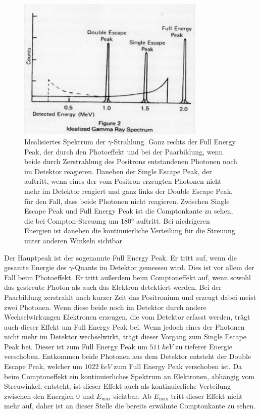 \begin{figure}
	\centering
	\includegraphics[width=0.8\textwidth]{gammaray.png}
	\caption{Idealisiertes Spektrum der $\gamma$-Strahlung. Ganz rechts der Full Energy Peak, der durch den Photoeffekt und bei der Paarbildung, wenn beide durch Zerstrahlung des Positrons entstandenen Photonen noch im Detektor reagieren. Daneben der Single Escape Peak, der auftritt, wenn eines der vom Positron erzeugten Photonen nicht mehr im Detektor reagiert und ganz links der Double Escape Peak, für den Fall, dass beide Photonen nicht reagieren. Zwischen Single Escape Peak und Full Energy Peak ist die Comptonkante zu sehen, die bei Compton-Streuung um $180$° auftritt. Bei niedrigeren Energien ist daneben die kontinuierliche Verteilung für die Streuung unter anderen Winkeln sichtbar}
	\label{idealized_spectrum}
\end{figure}

Der Hauptpeak ist der sogenannte Full Energy Peak. Er tritt auf, wenn die gesamte Energie des $\gamma$-Quants im Detektor gemessen wird. Dies ist vor allem der Fall beim Photoeffekt. Er tritt außerdem beim Comptoneffekt auf, wenn sowohl das gestreute Photon als auch das Elektron detektiert werden. Bei der Paarbildung zerstrahlt nach kurzer Zeit das Positronium und erzeugt dabei meist zwei Photonen. Wenn diese beide noch im Detektor durch andere Wechselwirkungen Elektronen erzeugen, die vom Detektor erfasst werden, trägt auch dieser Effekt um Full Energy Peak bei. Wenn jedoch eines der Photonen nicht mehr im Detektor wechselwirkt, trägt dieser Vorgang zum Single Escape Peak bei. Dieser ist zum Full Energy Peak um $\SI{511}{keV}$ zu tieferer Energie verschoben. Entkommen beide Photonen aus dem Detektor entsteht der Double Escape Peak, welcher um $\SI{1022}{keV}$ zum Full Energy Peak verschoben ist. Da beim Comptoneffekt ein kontinuierliches Spektrum an Elektronen, abhängig vom Streuwinkel, entsteht, ist dieser Effekt auch als kontinuierliche Verteilung zwischen den Energien $0$ und $E_\text{max}$ sichtbar. Ab $E_\text{max}$ tritt dieser Effekt nicht mehr auf, daher ist an dieser Stelle die bereits erwähnte Comptonkante zu sehen.

